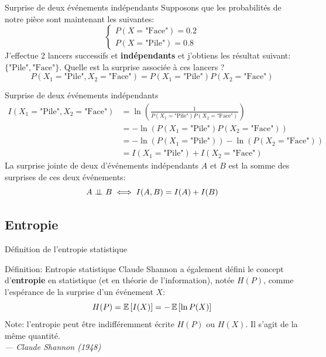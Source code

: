 \begin{frame}{Surprise de deux événements indépendants}
	Supposons que les probabilités de notre pièce sont maintenant les suivantes:
	\begin{equation*}
		\begin{cases}
			P(X = \text{"Face"}) = 0.2 \\
			P(X = \text{"Pile"}) = 0.8
		\end{cases}
	\end{equation*}
	\pause
	J'effectue 2 lancers successifs et \textbf{indépendants} et j'obtiens les résultat suivant: $\{\text{"Pile"}, \text{"Face"}\}$. Quelle est la surprise associée à ces lancers ?
	\begin{equation*}
		P(X_1 = \text{"Pile"}, X_2 = \text{"Face"}) = P(X_1 = \text{"Pile"}) P(X_2 = \text{"Face"})
	\end{equation*}
\end{frame}

\begin{frame}{Surprise de deux événements indépendants}
	\begin{equation*}
		\begin{aligned}
			I(X_1 = \text{"Pile"}, X_2 = \text{"Face"}) 
			&= \ln{\left(\frac{1}{P(X_1 = \text{"Pile"}) P(X_2 = \text{"Face"})}\right)} \\
			&= - \ln{\left(P(X_1 = \text{"Pile"}) P(X_2 = \text{"Face"})\right)} \\
			&= - \ln{\left(P(X_1 = \text{"Pile"})\right)}  - \ln{\left(P(X_2 = \text{"Face"})\right)} \\
			&= I(X_1 = \text{"Pile"}) + I(X_2 = \text{"Face"})
		\end{aligned}
	\end{equation*}
	\pause
	La surprise jointe de deux d'événements indépendants $A$ et $B$ est la somme des surprises de ces deux événements:
	\begin{equation*}
		A \perp\!\!\!\perp B \iff I(A, B) = I(A) + I(B)
	\end{equation*}
\end{frame}

\subsection[Entropie]{Entropie}

\begin{frame}{Définition de l'entropie statistique}
	\begin{block}{Définition: Entropie statistique}
		Claude Shannon a également défini le concept d'\textbf{entropie} en statistique (et en théorie de l'information), notée $H(P)$, comme l'espérance de la surprise d'un événement $X$:
		\begin{equation*}
			H(P) = \operatorname{\mathbb{E}}\left[I(X)\right] = - \operatorname{\mathbb{E}}\left[\ln{P(X)}\right]
		\end{equation*}
		Note: l'entropie peut être indifféremment écrite $H(P)$ ou $H(X)$. Il s'agit de la même quantité. \\
		\vspace{0.3cm}
		\hfill
		\textit{--- Claude Shannon (1948)}
	\end{block}
\end{frame}

